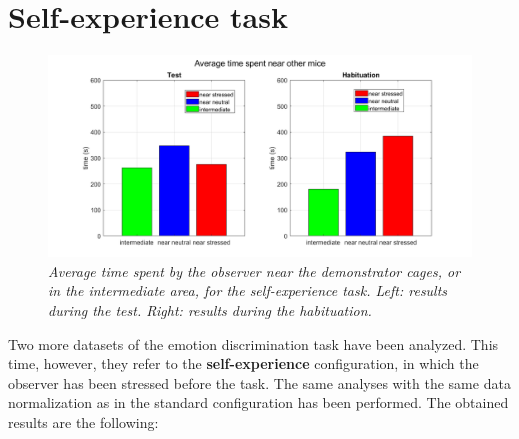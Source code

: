 \documentclass[12pt, a4paper]{report}
\begin{document}
\section{Self-experience task}


\begin{figure}[H]
	
	\begin{center}
		\hspace*{-1.4cm}
		\includegraphics[scale=.5]{times_self.png} 
	\end{center} 
	\caption{\textit{Average time spent by the observer near the demonstrator cages, or in the intermediate area, for the self-experience task. Left: results during the test. Right: results during the habituation.}}
	\label{times_self}
\end{figure}


Two more datasets of the emotion discrimination task have been analyzed. This time, however, they refer to the \textbf{self-experience} configuration, in which the observer has been stressed before the task. The same analyses with the same data normalization as in the standard configuration has been performed. The obtained results are the following:
\end{document}
